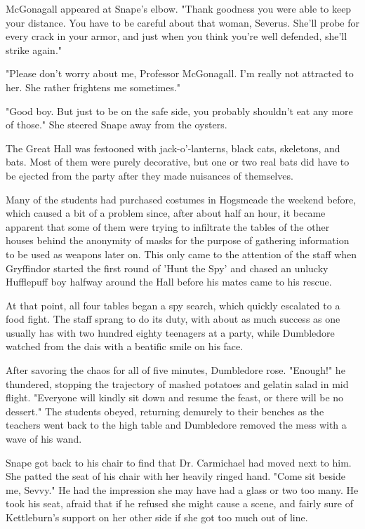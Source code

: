 \documentclass[a4paper,11pt]{article}
\begin{document}
McGonagall appeared at Snape's elbow. "Thank goodness you were able to keep your distance. You have to be careful about that woman, Severus. She'll probe for every crack in your armor, and just when you think you're well defended, she'll strike again."

"Please don't worry about me, Professor McGonagall. I'm really not attracted to her. She rather frightens me sometimes."

"Good boy. But just to be on the safe side, you probably shouldn't eat any more of those." She steered Snape away from the oysters.

The Great Hall was festooned with jack-o'-lanterns, black cats, skeletons, and bats. Most of them were purely decorative, but one or two real bats did have to be ejected from the party after they made nuisances of themselves.

Many of the students had purchased costumes in Hogsmeade the weekend before, which caused a bit of a problem since, after about half an hour, it became apparent that some of them were trying to infiltrate the tables of the other houses behind the anonymity of masks for the purpose of gathering information to be used as weapons later on. This only came to the attention of the staff when Gryffindor started the first round of 'Hunt the Spy' and chased an unlucky Hufflepuff boy halfway around the Hall before his mates came to his rescue.

At that point, all four tables began a spy search, which quickly escalated to a food fight. The staff sprang to do its duty, with about as much success as one usually has with two hundred eighty teenagers at a party, while Dumbledore watched from the dais with a beatific smile on his face.

After savoring the chaos for all of five minutes, Dumbledore rose. "Enough!" he thundered, stopping the trajectory of mashed potatoes and gelatin salad in mid flight. "Everyone will kindly sit down and resume the feast, or there will be no dessert." The students obeyed, returning demurely to their benches as the teachers went back to the high table and Dumbledore removed the mess with a wave of his wand.

Snape got back to his chair to find that Dr. Carmichael had moved next to him. She patted the seat of his chair with her heavily ringed hand. "Come sit beside me, Sevvy." He had the impression she may have had a glass or two too many. He took his seat, afraid that if he refused she might cause a scene, and fairly sure of Kettleburn's support on her other side if she got too much out of line.
\end{document}
